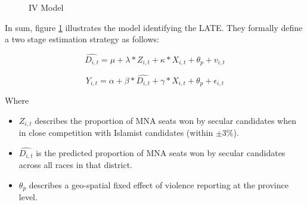\documentclass{scrartcl}
\begin{document}
\begin{figure}[h]
  \centering
  \caption{IV Model}
  \label{fig:ate_iv}
\end{figure}

In sum, figure \ref{fig:ate_iv} illustrates the model identifying the LATE.
They formally define a two stage estimation strategy as follows:

\begin{equation} \label{eq:2}
  \widehat{D_{i,t}} = \mu + \lambda * Z_{i,t} + \kappa*X_{i,t} + \theta_p + v_{i,t}
\end{equation}

 \begin{equation} \label{eq:3}
  Y_{i,t} = \alpha + \beta * \widehat{D_{i,t}} + \gamma*X_{i,t} + \theta_{p} + \epsilon_{i,t}
\end{equation}

Where

\begin{itemize}
\item $Z_{i,t}$ describes the proportion of MNA seats won by secular candidates when in close competition with Islamist candidates (within $\pm 3\%$).
\item $\widehat{D_{i,t}}$ is the predicted proportion of MNA seats won by secular candidates across all races in that district.
\item $\theta_p$ describes a geo-spatial fixed effect of violence reporting at the province level. 
\end{itemize}
\end{document}
